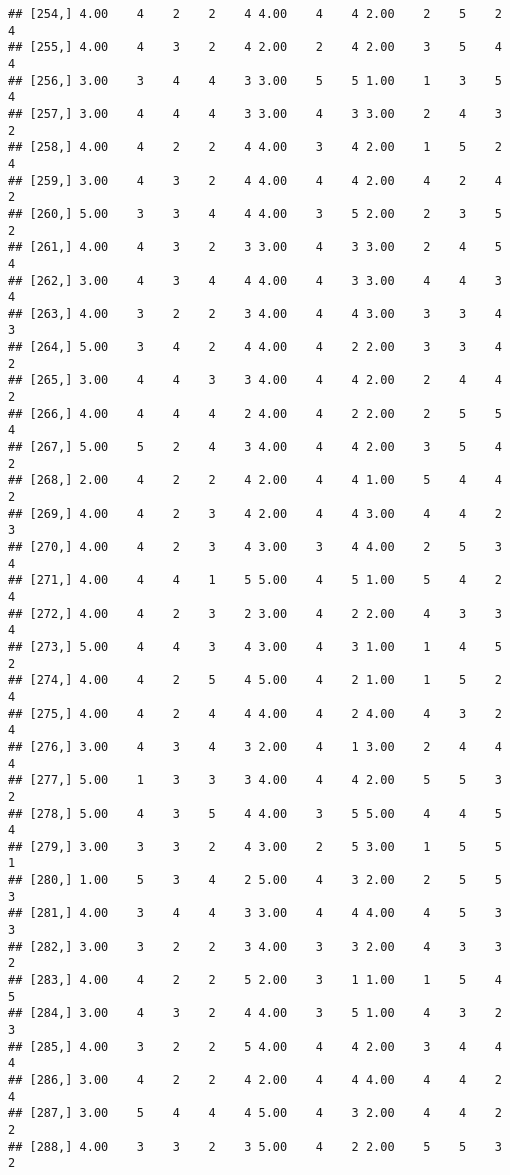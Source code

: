 \documentclass[]{article}
\begin{document}
\begin{verbatim}
## [254,] 4.00    4    2    2    4 4.00    4    4 2.00    2    5    2    4
## [255,] 4.00    4    3    2    4 2.00    2    4 2.00    3    5    4    4
## [256,] 3.00    3    4    4    3 3.00    5    5 1.00    1    3    5    4
## [257,] 3.00    4    4    4    3 3.00    4    3 3.00    2    4    3    2
## [258,] 4.00    4    2    2    4 4.00    3    4 2.00    1    5    2    4
## [259,] 3.00    4    3    2    4 4.00    4    4 2.00    4    2    4    2
## [260,] 5.00    3    3    4    4 4.00    3    5 2.00    2    3    5    2
## [261,] 4.00    4    3    2    3 3.00    4    3 3.00    2    4    5    4
## [262,] 3.00    4    3    4    4 4.00    4    3 3.00    4    4    3    4
## [263,] 4.00    3    2    2    3 4.00    4    4 3.00    3    3    4    3
## [264,] 5.00    3    4    2    4 4.00    4    2 2.00    3    3    4    2
## [265,] 3.00    4    4    3    3 4.00    4    4 2.00    2    4    4    2
## [266,] 4.00    4    4    4    2 4.00    4    2 2.00    2    5    5    4
## [267,] 5.00    5    2    4    3 4.00    4    4 2.00    3    5    4    2
## [268,] 2.00    4    2    2    4 2.00    4    4 1.00    5    4    4    2
## [269,] 4.00    4    2    3    4 2.00    4    4 3.00    4    4    2    3
## [270,] 4.00    4    2    3    4 3.00    3    4 4.00    2    5    3    4
## [271,] 4.00    4    4    1    5 5.00    4    5 1.00    5    4    2    4
## [272,] 4.00    4    2    3    2 3.00    4    2 2.00    4    3    3    4
## [273,] 5.00    4    4    3    4 3.00    4    3 1.00    1    4    5    2
## [274,] 4.00    4    2    5    4 5.00    4    2 1.00    1    5    2    4
## [275,] 4.00    4    2    4    4 4.00    4    2 4.00    4    3    2    4
## [276,] 3.00    4    3    4    3 2.00    4    1 3.00    2    4    4    4
## [277,] 5.00    1    3    3    3 4.00    4    4 2.00    5    5    3    2
## [278,] 5.00    4    3    5    4 4.00    3    5 5.00    4    4    5    4
## [279,] 3.00    3    3    2    4 3.00    2    5 3.00    1    5    5    1
## [280,] 1.00    5    3    4    2 5.00    4    3 2.00    2    5    5    3
## [281,] 4.00    3    4    4    3 3.00    4    4 4.00    4    5    3    3
## [282,] 3.00    3    2    2    3 4.00    3    3 2.00    4    3    3    2
## [283,] 4.00    4    2    2    5 2.00    3    1 1.00    1    5    4    5
## [284,] 3.00    4    3    2    4 4.00    3    5 1.00    4    3    2    3
## [285,] 4.00    3    2    2    5 4.00    4    4 2.00    3    4    4    4
## [286,] 3.00    4    2    2    4 2.00    4    4 4.00    4    4    2    4
## [287,] 3.00    5    4    4    4 5.00    4    3 2.00    4    4    2    2
## [288,] 4.00    3    3    2    3 5.00    4    2 2.00    5    5    3    2

\end{verbatim}
\end{document}
